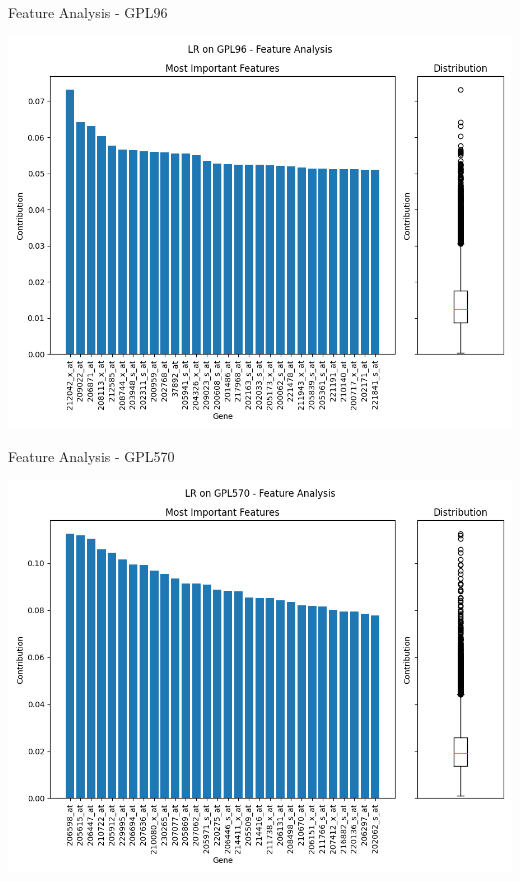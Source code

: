 \documentclass{beamer}
\begin{document}
    \begin{frame}{Feature Analysis - GPL96}
        \begin{center}
            \includegraphics[scale=.45]{LRonGPL96Features.png}
        \end{center}
    \end{frame}

    \begin{frame}{Feature Analysis - GPL570}
        \begin{center}
            \includegraphics[scale=.45]{LRonGPL570Features.png}
        \end{center}
    \end{frame}
\end{document}
